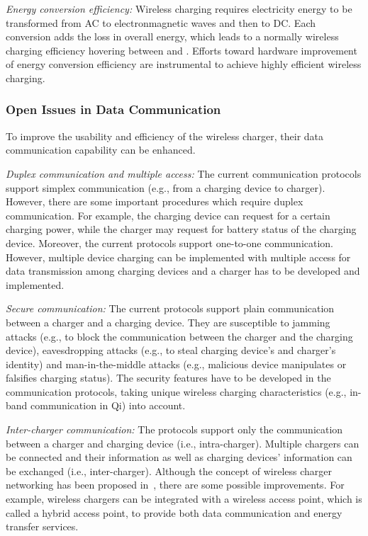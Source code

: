 \documentclass[twocolumn,10pt]{IEEEtran}
\begin{document}
{\em Energy conversion efficiency:} Wireless charging requires electricity energy to be transformed from  AC to electronmagnetic waves and then to DC. Each conversion adds the loss in overall energy, which leads to a normally wireless charging efficiency hovering between  and . Efforts toward hardware improvement of energy conversion efficiency are instrumental to achieve highly efficient wireless charging.


\subsubsection{Open Issues in Data Communication}

To improve the usability and efficiency of the wireless charger, their data communication capability can be enhanced. 

{\em Duplex communication and multiple access:} The current communication protocols support simplex communication (e.g., from a charging device to charger). However, there are some important procedures which require duplex communication. For example, the charging device can request for a certain charging power, while the charger may request for battery status of the charging device. Moreover, the current protocols support one-to-one communication. However, multiple device charging can be implemented 
with multiple access for data transmission among charging devices and a charger has to be developed and implemented.

{\em Secure communication:} The current protocols support plain communication between a charger and a charging device. They are susceptible to jamming attacks \cite{D.NiyatoJammingICC,D.NiyatoJammingWCNC}  (e.g., to block the communication between the charger and the charging device), eavesdropping attacks (e.g., to steal charging device's and charger's identity) and man-in-the-middle attacks (e.g., malicious device manipulates or falsifies charging status). The security features have to be developed in the communication protocols, taking unique wireless charging characteristics (e.g., in-band communication in Qi) into account. 

{\em Inter-charger communication:} The protocols support only the communication between a charger and charging device (i.e., intra-charger). Multiple chargers can be connected and their information as well as charging devices' information can be exchanged (i.e., inter-charger). Although  the concept of wireless charger networking has been proposed in~\cite{X.1410.8635Lu}, there are some possible improvements. For example, wireless chargers can be integrated with a wireless access point, which is called a hybrid access point, to provide both data communication and energy transfer services.
\end{document}
